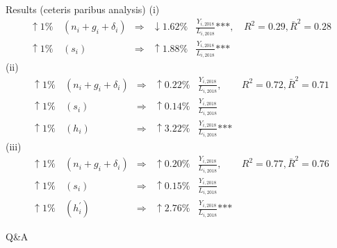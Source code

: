 \documentclass{beamer}
\begin{document}
\begin{frame}[shrink=20]{Results (ceteris paribus analysis)}
(i)
\begin{align*}
\uparrow 1\% & \, (n_i + g_i + \delta_i) & \Rightarrow &  \downarrow 1.62\% & \frac{Y_{i,2018}}{L_{i,2018}} \text{***}, & \, R^2 = 0.29, \bar{R}^2 = 0.28 \\
\uparrow 1\% & \, (s_i) & \Rightarrow &  \uparrow 1.88\% & \frac{Y_{i,2018}}{L_{i,2018}} \text{***} &
\end{align*}
(ii)
\begin{align*}
\uparrow 1\% & \, (n_i + g_i + \delta_i) & \Rightarrow &  \uparrow 0.22\% & \frac{Y_{i,2018}}{L_{i,2018}} \text{}, & \, R^2 = 0.72, \bar{R}^2 = 0.71 \\
\uparrow 1\% & \, (s_i) & \Rightarrow &  \uparrow 0.14\% & \frac{Y_{i,2018}}{L_{i,2018}} \text{} & \\
\uparrow 1\% & \, (h_i) & \Rightarrow &  \uparrow 3.22\% & \frac{Y_{i,2018}}{L_{i,2018}}  \text{***} &
\end{align*}
(iii)
\begin{align*}
	\uparrow 1\% & \, (n_i + g_i + \delta_i) & \Rightarrow &  \uparrow 0.20\% & \frac{Y_{i,2018}}{L_{i,2018}} \text{}, & \, R^2 = 0.77, \bar{R}^2 = 0.76 \\
	\uparrow 1\% & \, (s_i) & \Rightarrow &  \uparrow 0.15\% & \frac{Y_{i,2018}}{L_{i,2018}}  \text{} & \\
	\uparrow 1\% & \, (h^\prime_i) & \Rightarrow &  \uparrow 2.76\% & \frac{Y_{i,2018}}{L_{i,2018}}  \text{***} &
\end{align*}

\end{frame}

\begin{frame}
	\begin{center}
		Q\&A
	\end{center}
\end{frame}
\end{document}
